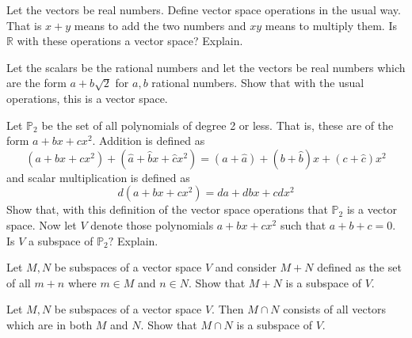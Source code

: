 \documentclass{ximera}
\begin{document}
\begin{problem}\label{prb:10.14} Let the vectors be real numbers. Define vector space operations in the
usual way. That is $x+y$ means to add the two numbers and $xy$ means to
multiply them. Is $\mathbb{R}$ with these operations a vector space? Explain.
\end{problem}

\begin{problem}\label{prb:10.15} Let the scalars be the rational numbers and let the vectors be
real numbers which are the form $a+b\sqrt{2}$ for $a,b$ rational numbers.
Show that with the usual operations, this is a vector space.
\end{problem}

\begin{problem}\label{prb:10.16} Let $\mathbb{P}_{2}$ be the set of all polynomials of degree 2 or
less. That is, these are of the form $a+bx+cx^{2}$. Addition is defined as
\begin{equation*}
\left( a+bx+cx^{2}\right) +\left( \hat{a}+\hat{b}x+\hat{c}x^{2}\right)
=\left( a+\hat{a}\right) +\left( b+\hat{b}\right) x+\left( c+\hat{c}\right)
x^{2}
\end{equation*}
and scalar multiplication is defined as
\begin{equation*}
d\left( a+bx+cx^{2}\right) =da+dbx+cdx^{2}
\end{equation*}
Show that, with this definition of the vector space operations that $\mathbb{
P}_{2}$ is a vector space. Now let $V$ denote those polynomials $a+bx+cx^{2}$
such that $a+b+c=0$. Is $V$ a subspace of $\mathbb{P}_{2}?$ Explain.
\end{problem}

\begin{problem}\label{prb:10.17} Let $M,N$ be subspaces of a vector space $V$ and consider $M+N$
defined as the set of all $m+n$ where $m\in M$ and $n\in N$. Show that $M+N$
is a subspace of $V$.
\end{problem}

\begin{problem}\label{prb:10.18} Let $M,N$ be subspaces of a vector space $V$. Then $M\cap N$ consists
of all vectors which are in both $M$ and $N$. Show that $M\cap N$ is a
subspace of $V$.
\end{problem}
\end{document}
